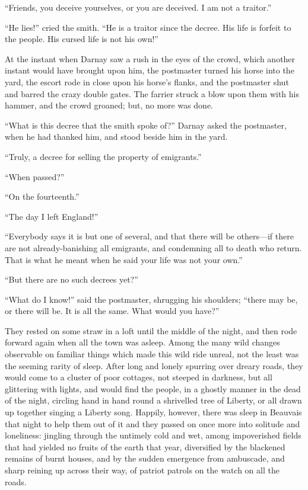 ``Friends, you deceive yourselves, or you are deceived.  I am not a traitor.''

``He lies!'' cried the smith. ``He is a traitor since the decree.
His life is forfeit to the people.  His cursed life is not his own!''

At the instant when Darnay saw a rush in the eyes of the crowd,
which another instant would have brought upon him, the postmaster
turned his horse into the yard, the escort rode in close upon his
horse's flanks, and the postmaster shut and barred the crazy double
gates.  The farrier struck a blow upon them with his hammer, and the
crowd groaned; but, no more was done.

``What is this decree that the smith spoke of?'' Darnay asked the
postmaster, when he had thanked him, and stood beside him in the yard.

``Truly, a decree for selling the property of emigrants.''

``When passed?''

``On the fourteenth.''

``The day I left England!''

``Everybody says it is but one of several, and that there will be
others---if there are not already-banishing all emigrants, and
condemning all to death who return.  That is what he meant when he
said your life was not your own.''

``But there are no such decrees yet?''

``What do I know!'' said the postmaster, shrugging his shoulders;
``there may be, or there will be.  It is all the same.  What would
you have?''

They rested on some straw in a loft until the middle of the night,
and then rode forward again when all the town was asleep.  Among the
many wild changes observable on familiar things which made this wild
ride unreal, not the least was the seeming rarity of sleep.
After long and lonely spurring over dreary roads, they would come to
a cluster of poor cottages, not steeped in darkness, but all
glittering with lights, and would find the people, in a ghostly
manner in the dead of the night, circling hand in hand round a
shrivelled tree of Liberty, or all drawn up together singing a
Liberty song.  Happily, however, there was sleep in Beauvais that
night to help them out of it and they passed on once more into
solitude and loneliness:  jingling through the untimely cold and wet,
among impoverished fields that had yielded no fruits of the earth
that year, diversified by the blackened remains of burnt houses, and
by the sudden emergence from ambuscade, and sharp reining up across
their way, of patriot patrols on the watch on all the roads.

